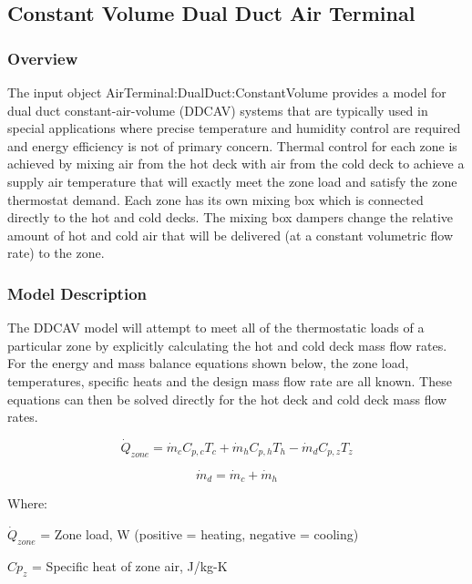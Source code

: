 \subsection{Constant Volume Dual Duct Air Terminal}\label{constant-volume-dual-duct-air-terminal}

\subsubsection{Overview}\label{overview-3-000}

The input object AirTerminal:DualDuct:ConstantVolume provides a model for dual duct constant-air-volume (DDCAV) systems that are typically used in special applications where precise temperature and humidity control are required and energy efficiency is not of primary concern. Thermal control for each zone is achieved by mixing air from the hot deck with air from the cold deck to achieve a supply air temperature that will exactly meet the zone load and satisfy the zone thermostat demand. Each zone has its own mixing box which is connected directly to the hot and cold decks. The mixing box dampers change the relative amount of hot and cold air that will be delivered (at a constant volumetric flow rate) to the zone.

\subsubsection{Model Description}\label{model-description-2-000}

The DDCAV model will attempt to meet all of the thermostatic loads of a particular zone by explicitly calculating the hot and cold deck mass flow rates. For the energy and mass balance equations shown below, the zone load, temperatures, specific heats and the design mass flow rate are all known. These equations can then be solved directly for the hot deck and cold deck mass flow rates.

\begin{equation}
\dot Q_{zone} = \dot m_c C_{p,c} T_c + \dot m_h C_{p,h}T_h - \dot m_d C_{p,z} T_z
\end{equation}

\begin{equation}
\dot m_d = \dot m_c + \dot m_h
\end{equation}

Where:

\(\dot Q_{zone}\) = Zone load, W (positive = heating, negative = cooling)

\(C{p_z}\) = Specific heat of zone air, J/kg-K

